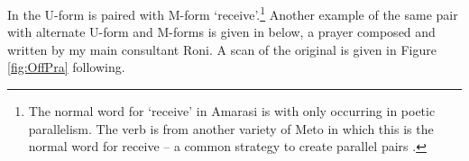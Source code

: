 \begin{exe}
	\label{ex:120715-0, 0.45-0.58}
	\begin{xlist}
		\vspace{4pt}
		\label{ex:120715-0, 0.51}
	\end{xlist}
\end{exe}

In  the U-form  is paired with M-form  `receive'.\footnote{
		The normal word for `receive' in Amarasi is 
		with  only occurring in poetic parallelism.
		The verb  is from another variety of Meto
		in which this is the normal word for receive
		-- a common strategy to create parallel pairs \citep[27f]{grth97}.}
Another example of the same pair with
alternate U-form and M-forms is given in  below,
a prayer composed and written by my main consultant Roni.
A scan of the original is given in Figure \ref{fig:OffPra} following.

